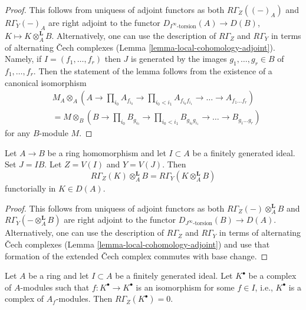 \begin{proof}
This follows from uniquess of adjoint functors as both
$R\Gamma_Z((-)_A)$ and $R\Gamma_Y(-)_A$
are right adjoint to the functor $D_{I^\infty\text{-torsion}}(A) \to D(B)$,
$K \mapsto K \otimes_A^\mathbf{L} B$.
Alternatively, one can use the description of $R\Gamma_Z$ and $R\Gamma_Y$
in terms of alternating {\v C}ech complexes
(Lemma \ref{lemma-local-cohomology-adjoint}).
Namely, if $I = (f_1, \ldots, f_r)$ then $J$ is generated by the images
$g_1, \ldots, g_r \in B$ of $f_1, \ldots, f_r$.
Then the statement of the lemma follows from the existence of
a canonical isomorphism
\begin{align*}
& M_A \otimes_A (A \to \prod\nolimits_{i_0} A_{f_{i_0}} \to
\prod\nolimits_{i_0 < i_1} A_{f_{i_0}f_{i_1}}
\to \ldots \to A_{f_1\ldots f_r}) \\
& = 
M \otimes_B (B \to \prod\nolimits_{i_0} B_{g_{i_0}} \to
\prod\nolimits_{i_0 < i_1} B_{g_{i_0}g_{i_1}}
\to \ldots \to B_{g_1\ldots g_r})
\end{align*}
for any $B$-module $M$.
\end{proof}

\begin{lemma}
\label{lemma-torsion-change-rings}
Let $A \to B$ be a ring homomorphism and let $I \subset A$
be a finitely generated ideal. Set $J = IB$. Let $Z = V(I)$ and $Y = V(J)$.
Then
$$
R\Gamma_Z(K) \otimes_A^\mathbf{L} B = R\Gamma_Y(K \otimes_A^\mathbf{L} B)
$$
functorially in $K \in D(A)$.
\end{lemma}

\begin{proof}
This follows from uniquess of adjoint functors
as both $R\Gamma_Z( - ) \otimes_A^\mathbf{L} B$ and
$R\Gamma_Y(- \otimes_A^\mathbf{L} B)$
are right adjoint to the functor
$D_{J^\infty\text{-torsion}}(B) \to D(A)$. Alternatively, one can use
the description of $R\Gamma_Z$ and $R\Gamma_Y$ in terms of alternating
{\v C}ech complexes (Lemma \ref{lemma-local-cohomology-adjoint})
and use that formation of the extended {\v C}ech
complex commutes with base change.
\end{proof}

\begin{lemma}
\label{lemma-local-cohomology-vanishes}
Let $A$ be a ring and let $I \subset A$ be a finitely generated ideal.
Let $K^\bullet$ be a complex of $A$-modules such that
$f : K^\bullet \to K^\bullet$ is an isomorphism for some
$f \in I$, i.e., $K^\bullet$ is a complex of $A_f$-modules. Then
$R\Gamma_Z(K^\bullet) = 0$.
\end{lemma}

